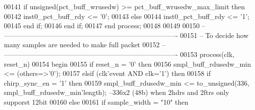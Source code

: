 \begin{DoxyCode}
00141       \textcolor{keywordflow}{if} \textcolor{comment}{unsigned}\textcolor{vhdlchar}{(}\textcolor{vhdlchar}{pct_buff_wrusedw}\textcolor{vhdlchar}{)} \textcolor{vhdlchar}{>=} \textcolor{vhdlchar}{pct_buff_wrusedw_max_limit} \textcolor{keywordflow}{then} 
00142          inst0\_pct\_buff\_rdy <= '0';
00143       \textcolor{keywordflow}{else}
00144          inst0\_pct\_buff\_rdy <= '1';
00145       \textcolor{keywordflow}{end} \textcolor{keywordflow}{if};
00146    \textcolor{keywordflow}{end} \textcolor{keywordflow}{if};
00147 \textcolor{keywordflow}{end} \textcolor{keywordflow}{process};
00148 
00149 
00150 \textcolor{keyword}{-- ----------------------------------------------------------------------------}
00151 \textcolor{keyword}{-- To decide how many samples are needed to make full packet}
00152 \textcolor{keyword}{-- ----------------------------------------------------------------------------}
00153 \textcolor{keywordflow}{process}(clk, reset_n)
00154 \textcolor{vhdlkeyword}{begin}
00155    \textcolor{keywordflow}{if} \textcolor{vhdlchar}{reset_n} \textcolor{vhdlchar}{=} \textcolor{vhdlchar}{'}\textcolor{vhdllogic}{}\textcolor{vhdllogic}{0}\textcolor{vhdlchar}{'} \textcolor{keywordflow}{then} 
00156       \textcolor{vhdlchar}{smpl_buff_rdusedw_min} \textcolor{vhdlchar}{<=} \textcolor{vhdlchar}{(}\textcolor{keywordflow}{others}\textcolor{vhdlchar}{=}\textcolor{vhdlchar}{>}\textcolor{vhdlchar}{'}\textcolor{vhdllogic}{}\textcolor{vhdllogic}{0}\textcolor{vhdlchar}{'}\textcolor{vhdlchar}{)};
00157    \textcolor{keywordflow}{elsif} \textcolor{vhdlchar}{(}\textcolor{vhdlchar}{clk}\textcolor{vhdlchar}{'}\textcolor{vhdlkeyword}{event} \textcolor{keywordflow}{AND} \textcolor{vhdlchar}{clk}\textcolor{vhdlchar}{=}\textcolor{vhdlchar}{'}\textcolor{vhdllogic}{}\textcolor{vhdllogic}{1}\textcolor{vhdlchar}{'}\textcolor{vhdlchar}{)} \textcolor{keywordflow}{then}
00158         \textcolor{keywordflow}{if} \textcolor{vhdlchar}{chirp_sync_en} \textcolor{vhdlchar}{=} \textcolor{vhdlchar}{'}\textcolor{vhdllogic}{}\textcolor{vhdllogic}{1}\textcolor{vhdlchar}{'} \textcolor{keywordflow}{then}
00159             \textcolor{vhdlchar}{smpl_buff_rdusedw_min} \textcolor{vhdlchar}{<=} \textcolor{vhdlchar}{to\_unsigned}\textcolor{vhdlchar}{(}\textcolor{vhdllogic}{}\textcolor{vhdllogic}{336}\textcolor{vhdlchar}{,} \textcolor{vhdlchar}{smpl_buff_rdusedw_min}\textcolor{vhdlchar}{'}\textcolor{vhdlkeyword}{length}\textcolor{vhdlchar}{)};\textcolor{keyword}{ --336x2 (48b) when
       2hdrs and 2ftrs only supporst 12bit}
00160         \textcolor{keywordflow}{else}
00161             \textcolor{keywordflow}{if} \textcolor{vhdlchar}{sample_width} \textcolor{vhdlchar}{=} \textcolor{vhdllogic}{"10"} \textcolor{keywordflow}{then}

\end{DoxyCode}

